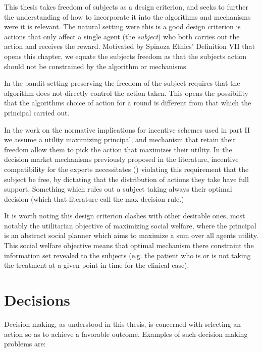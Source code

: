 This thesis takes freedom of subjects as a design criterion, and seeks to further the understanding of how to incorporate it into the  algorithms and mechanisms were it is relevant.
The natural setting were this is a good design criterion is actions that only affect a single agent (the \emph{subject}) who both carries out the action and receives the reward.
Motivated by Spinoza Ethics' Definition VII that opens this chapter, we equate the subjects freedom as that the subjects action should not be constrained by the algorithm or mechanisms.

In the bandit setting preserving the freedom of the subject requires that the algorithm does not directly control the action taken.
This opens the possibility that the algorithms choice of action for a round is different from that which the principal carried out.

In the work on the normative implications for incentive schemes used in part II we assume a utility maximizing principal, and mechanism that retain their freedom allow them to pick the action that maximizes their utility.
In the decision market mechanisms previously proposed in the literature, incentive compatibility for the experts necessitates (\cite{othman2010decision,chen2014eliciting}) violating this requirement that the subject be free, by dictating that the distribution of actions they take have full support. Something which rules out a subject taking always their optimal decision (which that literature call the max decision rule.)


It is worth noting this design criterion clashes with other desirable ones, most notably the utilitarian objective of maximizing social welfare, where the principal is an abstract social planner which aims to maximize a sum over all agents utility. This social welfare objective means that optimal mechanism there \cite{kremer2014implementing,mansour2015bayesian,mansour2016bayesian} constraint the information set revealed to the subjects (e.g. the patient who is or is not taking the treatment at a given point in time for the clinical case).







\section{Decisions}

Decision making, as understood in this thesis, is concerned with selecting an action so as to achieve a favorable outcome.
Examples of such decision making problems are:

